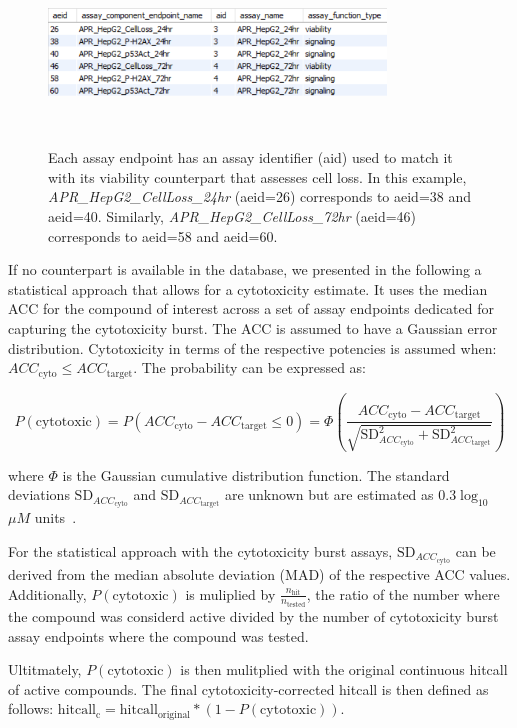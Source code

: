 \begin{figure} 
    \centering
    \includegraphics[width=0.8\textwidth]{figures/aeid_acid_aid.png}
    \caption{Each assay endpoint has an assay identifier (aid) used to match it with its viability counterpart that assesses cell loss. In this example, \emph{APR\_HepG2\_CellLoss\_24hr} (aeid=26) corresponds to aeid=38 and aeid=40. Similarly, \emph{APR\_HepG2\_CellLoss\_72hr} (aeid=46) corresponds to aeid=58 and aeid=60.}
~\label{fig:aeid_acid_aid}
\end{figure}

If no counterpart is available in the database, we presented in the following a statistical approach that allows for a cytotoxicity estimate. It uses the median ACC for the compound of interest across a set of assay endpoints dedicated for capturing the cytotoxicity burst. 
The ACC is assumed to have a Gaussian error distribution. Cytotoxicity in terms of the respective potencies is assumed when: $ACC_{\text{cyto}} \leq ACC_{\text{target}}$. The probability can be expressed as:

\[
P(\text{cytotoxic}) = P(ACC_{\text{cyto}} - ACC_{\text{target}} \leq 0) = \Phi\left(\frac{ACC_{\text{cyto}} - ACC_{\text{target}}}{\sqrt{\text{SD}_{ACC_{\text{cyto}}}^2 + \text{SD}_{ACC_{\text{target}}}^2 }}\right)
\]
    
where $\Phi$ is the Gaussian cumulative distribution function. The standard deviations $\text{SD}_{ACC_{\text{cyto}}}$ and $\text{SD}_{ACC_{\text{target}}}$ are unknown but are estimated as $0.3 \log_{10}$ ${\mu M}$ units~\cite{watt2018}. 

For the statistical approach with the cytotoxicity burst assays, $\text{SD}_{ACC_{\text{cyto}}}$ can be derived from the median absolute deviation (MAD) of the respective ACC values. Additionally, $P(\text{cytotoxic})$ is muliplied by $\frac{n_{\text{hit}}}{n_{\text{tested}}}$, the ratio of the number where the compound was considerd active divided by the number of cytotoxicity burst assay endpoints where the compound was tested. 

Ultitmately, $P(\text{cytotoxic})$ is then mulitplied with the original continuous hitcall of active compounds. The final cytotoxicity-corrected hitcall is then defined as follows: $\text{hitcall}_{\text{c}} = \text{hitcall}_{\text{original}} * (1 - P(\text{cytotoxic}))$.

